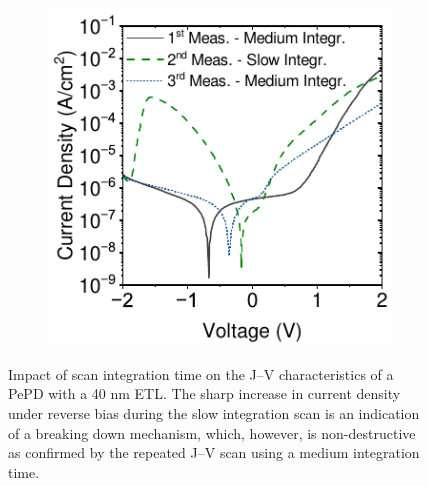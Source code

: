 \begin{figure}[htbp]
    \centering
    \begin{subfigure}[t]{0.5\textwidth}
        \centering
        \includegraphics[width=\textwidth]{chapters/transport_layers/images/JV_TiO12_Scan_Speed.pdf} %
                
    \end{subfigure}

    \caption{Impact of scan integration time on the J–V characteristics of a PePD with a 40 nm  ETL. The sharp increase in current density under reverse bias during the slow integration scan is an indication of a breaking down mechanism, which, however, is non-destructive as confirmed by the repeated J–V scan using a medium integration time.}
    \label{fig:tio2:scan_speed}
\end{figure}

